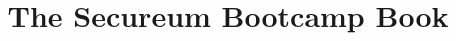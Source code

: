 \documentclass[a4paper,12pt]{book}
\begin{document}
\title{The Secureum Bootcamp Book}
\tableofcontents
\end{document}
